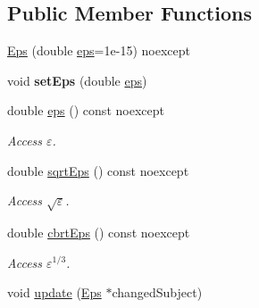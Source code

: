\subsection*{Public Member Functions}
\begin{DoxyCompactItemize}
\item 
\hyperlink{classSpacy_1_1Mixin_1_1Eps_a51dbe0b9cc950e0f3dfd34a481f08ae4}{Eps} (double \hyperlink{classSpacy_1_1Mixin_1_1Eps_a40e2ba8f3abd2b5370ef41238cfaaf8b}{eps}=1e-\/15) noexcept
\item 
void {\bfseries set\+Eps} (double \hyperlink{classSpacy_1_1Mixin_1_1Eps_a40e2ba8f3abd2b5370ef41238cfaaf8b}{eps})\hypertarget{classSpacy_1_1Mixin_1_1Eps_a1bbfd62541610d5d80f2782ab77158e4}{}\label{classSpacy_1_1Mixin_1_1Eps_a1bbfd62541610d5d80f2782ab77158e4}

\item 
double \hyperlink{classSpacy_1_1Mixin_1_1Eps_a40e2ba8f3abd2b5370ef41238cfaaf8b}{eps} () const noexcept\hypertarget{classSpacy_1_1Mixin_1_1Eps_a40e2ba8f3abd2b5370ef41238cfaaf8b}{}\label{classSpacy_1_1Mixin_1_1Eps_a40e2ba8f3abd2b5370ef41238cfaaf8b}

\begin{DoxyCompactList}\small\item\em Access $\varepsilon$. \end{DoxyCompactList}\item 
double \hyperlink{classSpacy_1_1Mixin_1_1Eps_a29e8c25dc3f1fdede57b8eb06f520fe1}{sqrt\+Eps} () const noexcept\hypertarget{classSpacy_1_1Mixin_1_1Eps_a29e8c25dc3f1fdede57b8eb06f520fe1}{}\label{classSpacy_1_1Mixin_1_1Eps_a29e8c25dc3f1fdede57b8eb06f520fe1}

\begin{DoxyCompactList}\small\item\em Access $\sqrt\varepsilon$. \end{DoxyCompactList}\item 
double \hyperlink{classSpacy_1_1Mixin_1_1Eps_a1879ebbf1b467cb4be36bcc63307018d}{cbrt\+Eps} () const noexcept\hypertarget{classSpacy_1_1Mixin_1_1Eps_a1879ebbf1b467cb4be36bcc63307018d}{}\label{classSpacy_1_1Mixin_1_1Eps_a1879ebbf1b467cb4be36bcc63307018d}

\begin{DoxyCompactList}\small\item\em Access $\varepsilon^{1/3}$. \end{DoxyCompactList}\item 
void \hyperlink{classSpacy_1_1Mixin_1_1Eps_a151216968daef3da5f5cdc0b957ce01b}{update} (\hyperlink{classSpacy_1_1Mixin_1_1Eps}{Eps} $\ast$changed\+Subject)\hypertarget{classSpacy_1_1Mixin_1_1Eps_a151216968daef3da5f5cdc0b957ce01b}{}\label{classSpacy_1_1Mixin_1_1Eps_a151216968daef3da5f5cdc0b957ce01b}


\end{DoxyCompactItemize}
